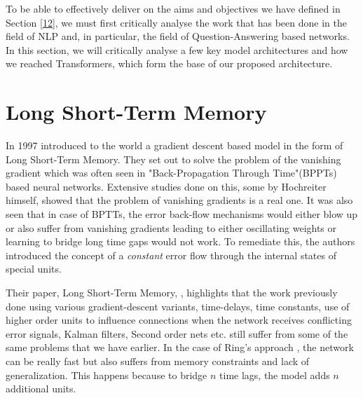 \documentclass[12pt]{report}
\begin{document}
    To be able to effectively deliver on the aims and objectives we have defined in Section \ref{12}, we must first critically analyse the work that has been done in the field of NLP and, in particular, the field of Question-Answering based networks. In this section, we will critically analyse a few key model architectures and how we reached Transformers, which form the base of our proposed architecture.


        \section{Long Short-Term Memory}\label{22}

            In 1997 \cite{lstmoriginal} introduced to the world a gradient descent based model in the form of Long Short-Term Memory. They set out to solve the problem of the vanishing gradient which was often seen in "Back-Propagation Through Time"(BPPTs) based neural networks. Extensive studies done on this, some by Hochreiter himself, showed that the problem of vanishing gradients is a real one. It was also seen that in case of BPTTs, the error back-flow mechanisms would either blow up or also suffer from vanishing gradients leading to either oscillating weights or learning to bridge long time gaps would not work. To remediate this, the authors introduced the concept of a \textit{constant} error flow through the internal states of special units.

            Their paper, Long Short-Term Memory, \citep{lstmoriginal}, highlights that the work previously done using various gradient-descent variants, time-delays, time constants, use of higher order units to influence connections when the network receives conflicting error signals, Kalman filters, Second order nets etc. still suffer from some of the same problems that we have earlier. In the case of Ring's approach \citep{lstmRing}, the network can be really fast but also suffers from memory constraints and lack of generalization. This happens because to bridge $ n $ time lags, the model adds $ n $ additional units.
\end{document}
